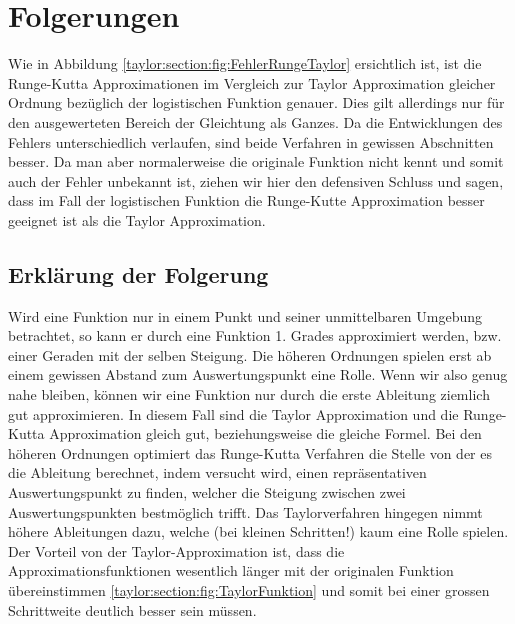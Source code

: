 %
%
%
\section{Folgerungen
\label{taylor:section:folgerungen}}
Wie in Abbildung \ref{taylor:section:fig:FehlerRungeTaylor} ersichtlich ist, ist die Runge-Kutta Approximationen im Vergleich zur Taylor Approximation gleicher Ordnung bezüglich der logistischen Funktion genauer.
Dies gilt allerdings nur für den ausgewerteten Bereich der Gleichtung als Ganzes.
Da die Entwicklungen des Fehlers unterschiedlich verlaufen, sind beide Verfahren in gewissen Abschnitten besser.
Da man aber normalerweise die originale Funktion nicht kennt und somit auch der Fehler unbekannt ist, ziehen wir hier den defensiven Schluss und sagen, dass im Fall der logistischen Funktion die Runge-Kutte Approximation besser geeignet ist als die Taylor Approximation.

\subsection{Erklärung der Folgerung
\label{taylor:subsection:malorum}}
Wird eine Funktion nur in einem Punkt und seiner unmittelbaren Umgebung betrachtet, so kann er durch eine Funktion 1. Grades approximiert werden, bzw. einer Geraden mit der selben Steigung.
Die höheren Ordnungen spielen erst ab einem gewissen Abstand zum Auswertungspunkt eine Rolle.
Wenn wir also genug nahe bleiben, können wir eine Funktion nur durch die erste Ableitung ziemlich gut approximieren.
In diesem Fall sind die Taylor Approximation und die Runge-Kutta Approximation gleich gut, beziehungsweise die gleiche Formel.
Bei den höheren Ordnungen optimiert das Runge-Kutta Verfahren die Stelle von der es die Ableitung berechnet, indem versucht wird, einen repräsentativen Auswertungspunkt zu finden, welcher die Steigung zwischen zwei Auswertungspunkten bestmöglich trifft.
Das Taylorverfahren hingegen nimmt höhere Ableitungen dazu, welche (bei kleinen Schritten!) kaum eine Rolle spielen. 
Der Vorteil von der Taylor-Approximation ist, dass die Approximationsfunktionen wesentlich länger mit der originalen Funktion übereinstimmen \ref{taylor:section:fig:TaylorFunktion} und somit bei einer grossen Schrittweite deutlich besser sein müssen.

